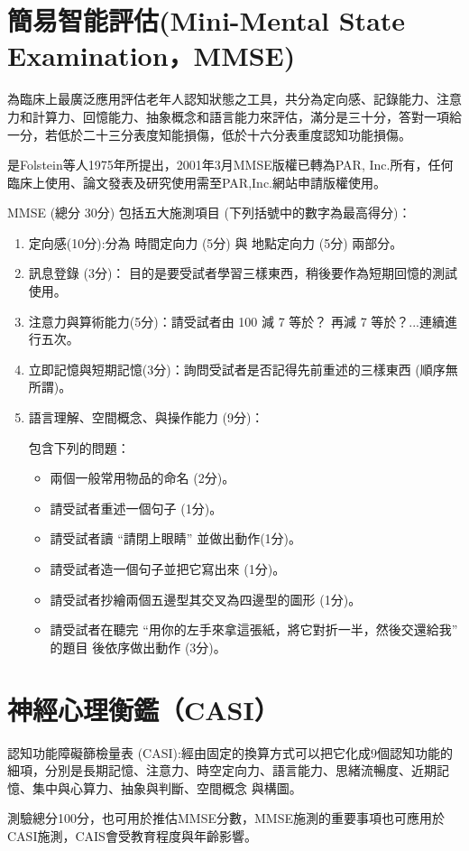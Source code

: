 \section{簡易智能評估(Mini-Mental State Examination，MMSE)}
為臨床上最廣泛應用評估老年人認知狀態之工具，共分為定向感、記錄能力、注意力和計算力、回憶能力、抽象概念和語言能力來評估，滿分是三十分，答對一項給一分，若低於二十三分表度知能損傷，低於十六分表重度認知功能損傷。


是Folstein等人1975年所提出，2001年3月MMSE版權已轉為PAR, Inc.所有，任何臨床上使用、論文發表及研究使用需至PAR,Inc.網站申請版權使用。

MMSE (總分 30分) 包括五大施測項目 (下列括號中的數字為最高得分)：
\begin{enumerate}
	\item
    定向感(10分):分為 時間定向力 (5分) 與 地點定向力 (5分) 兩部分。
	\item
	訊息登錄 (3分)： 目的是要受試者學習三樣東西，稍後要作為短期回憶的測試使用。
	\item
	注意力與算術能力(5分)：請受試者由 100 減 7 等於？ 再減 7 等於？...連續進行五次。
	\item
    立即記憶與短期記憶(3分)：詢問受試者是否記得先前重述的三樣東西 (順序無所謂)。
	\item
	語言理解、空間概念、與操作能力 (9分)： 
	
	包含下列的問題：
	\begin{itemize}
		\item
		兩個一般常用物品的命名 (2分)。
		\item
		請受試者重述一個句子 (1分)。
		\item
		請受試者讀 “請閉上眼睛” 並做出動作(1分)。
		\item
		請受試者造一個句子並把它寫出來 (1分)。
		\item
		請受試者抄繪兩個五邊型其交叉為四邊型的圖形 (1分)。 
		\item
		請受試者在聽完 “用你的左手來拿這張紙，將它對折一半，然後交還給我” 的題目
後依序做出動作 (3分)。
	\end{itemize}

\end{enumerate}




\section{神經心理衡鑑（CASI）}
認知功能障礙篩檢量表 (CASI):經由固定的換算方式可以把它化成9個認知功能的細項，分別是長期記憶、注意力、時空定向力、語言能力、思緒流暢度、近期記憶、集中與心算力、抽象與判斷、空間概念
與構圖。

測驗總分100分，也可用於推估MMSE分數，MMSE施測的重要事項也可應用於CASI施測，CAIS會受教育程度與年齡影響。






%

%

